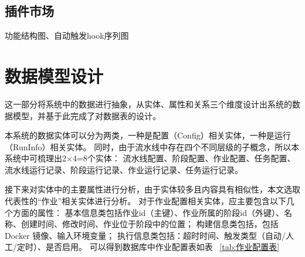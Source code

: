 \subsection{插件市场}
功能结构图、自动触发hook序列图



\section{数据模型设计}
这一部分将系统中的数据进行抽象，从实体、属性和关系三个维度设计出系统的数据模型，并基于此完成了对数据表的设计。

本系统的数据实体可以分为两类，一种是配置（Config）相关实体，一种是运行（RunInfo）相关实体。
同时，由于流水线中存在四个不同层级的子概念，所以本系统中可梳理出2×4=8个实体：
流水线配置、阶段配置、作业配置、任务配置、流水线运行记录、阶段运行记录、作业运行记录、任务运行记录。

接下来对实体中的主要属性进行分析，由于实体较多且内容具有相似性，本文选取代表性的“作业”相关实体进行分析。
对于作业配置相关实体，应主要包含以下几个方面的属性：
基本信息类包括作业id（主键）、作业所属的阶段id（外键）、名称、创建时间、修改时间、作业位于阶段中的位置；
构建信息类包括，包括 Docker 镜像、输入环境变量；
执行信息类包括：超时时间、触发类型（自动/人工/定时）、是否启用。
可以得到数据库中作业配置表如表~ \ref{tab:作业配置表}


